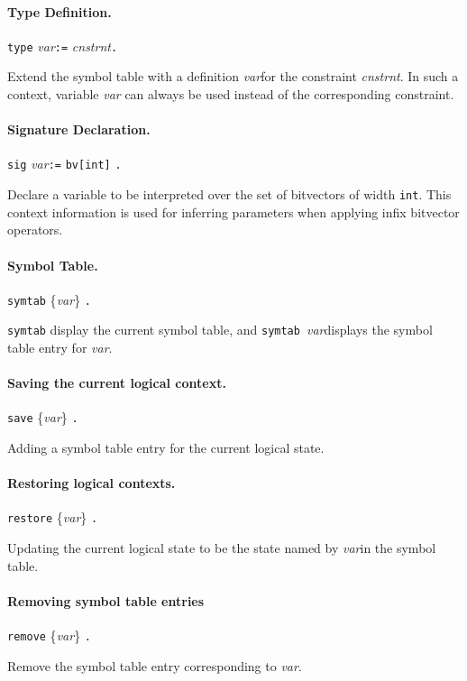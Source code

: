 \documentclass[12pt]{article}
\newcommand{\var}{\textit{var}}
\newcommand{\cnstrnt}{\textit{cnstrnt}}
\begin{document}
\paragraph{Type Definition.}
  \begin{center}
  \texttt{type} \var \texttt{:=} \cnstrnt \texttt{.}
  \end{center}
Extend the symbol table with a definition \var for the
constraint \cnstrnt\@. In such a context, variable \var 
can always be used instead of the corresponding constraint.

\paragraph{Signature Declaration.}
  \begin{center}
  \texttt{sig} \var \texttt{:=} \texttt{bv[int]} \texttt{.}
  \end{center}
Declare a variable to be interpreted over the set of 
bitvectors of width \texttt{int}. This context information
is used for inferring parameters when applying infix bitvector
operators.

\paragraph{Symbol Table.}
  \begin{center}
  \texttt{symtab} \{\var\} \texttt{.}
  \end{center}
\texttt{symtab} display the current symbol table, and
\texttt{symtab}\ \var displays the symbol table entry
for \var.

\paragraph{Saving the current logical context.}
  \begin{center}
  \texttt{save} \{\var\} \texttt{.}
  \end{center}
Adding a symbol table entry for the current logical state.

\paragraph{Restoring logical contexts.}
  \begin{center}
  \texttt{restore} \{\var\} \texttt{.}
  \end{center}
Updating the current logical state to be the state
named by \var in the symbol table.

\paragraph{Removing symbol table entries}
  \begin{center}
  \texttt{remove} \{\var\} \texttt{.}
  \end{center}
Remove the symbol table entry corresponding to \var.
\end{document}

